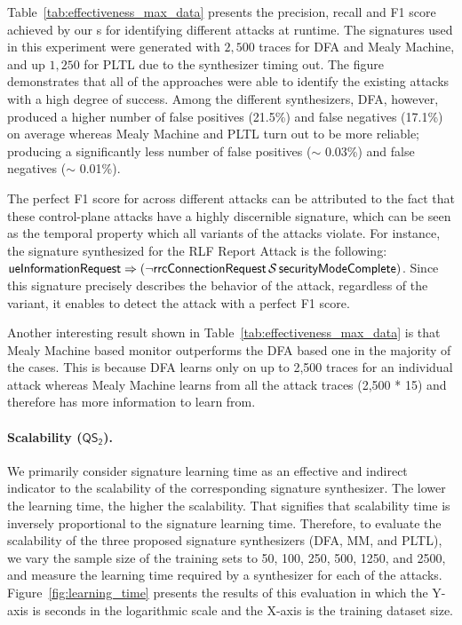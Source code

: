Table~\ref{tab:effectiveness_max_data} presents the precision, recall and F1 score
achieved by our \signatureSynthesizer{}s for identifying different attacks at runtime.
The signatures used in this experiment were generated with $2,500$ traces for
DFA and Mealy Machine, and up $1,250$ for PLTL due to the synthesizer
timing out. The figure
demonstrates that all of the approaches were able to identify the
existing attacks with a high degree of success.
Among the different synthesizers, DFA, however,
produced a higher number of false positives (21.5\%)
and false negatives (17.1\%) on average whereas
Mealy Machine and PLTL turn out to be more reliable;
producing a significantly less number of false
positives ($\sim\!\!$ 0.03\%) and false negatives ($\sim\!\!$ 0.01\%).

The perfect F1 score for \pltl across different attacks can be attributed
to the fact that these control-plane attacks have
a highly discernible signature, which can be seen as the temporal property
which all variants of the attacks violate. For instance,
the signature synthesized for the RLF Report Attack \cite{privacy_ndss16} is the following:
$\mathsf{ueInformationRequest} \Rightarrow (\neg \mathsf{rrcConnectionRequest} \,\mathrm{\cal S}\, \mathsf{securityModeComplete})$. Since this signature precisely describes the behavior of the attack, regardless of the variant,
it enables \system to detect the attack with a perfect F1 score.


Another interesting result shown in Table~\ref{tab:effectiveness_max_data}
is that Mealy Machine based monitor outperforms the DFA based one in the
majority of the cases. This is because
DFA learns only on up to 2,500 traces for an individual attack whereas
Mealy Machine learns from all the attack traces (2,500 * 15) and therefore
has more information to learn from.


\paragraph{Scalability ($\mathsf{QS_2}$).}
We primarily consider signature learning time as an effective and
indirect indicator to the scalability of the corresponding signature synthesizer.
The lower the learning time, the higher the scalability. That signifies that scalability time is inversely
proportional to the signature learning time. Therefore, to evaluate the scalability of
the three proposed signature synthesizers (DFA, MM, and PLTL),
we vary the sample size of the training sets to 50, 100, 250, 500, 1250, and 2500, and measure
the learning time required by a synthesizer for each of the attacks.
Figure~\ref{fig:learning_time} presents the results of this evaluation in which the Y-axis is seconds in the logarithmic scale and
the X-axis is the training dataset size.

